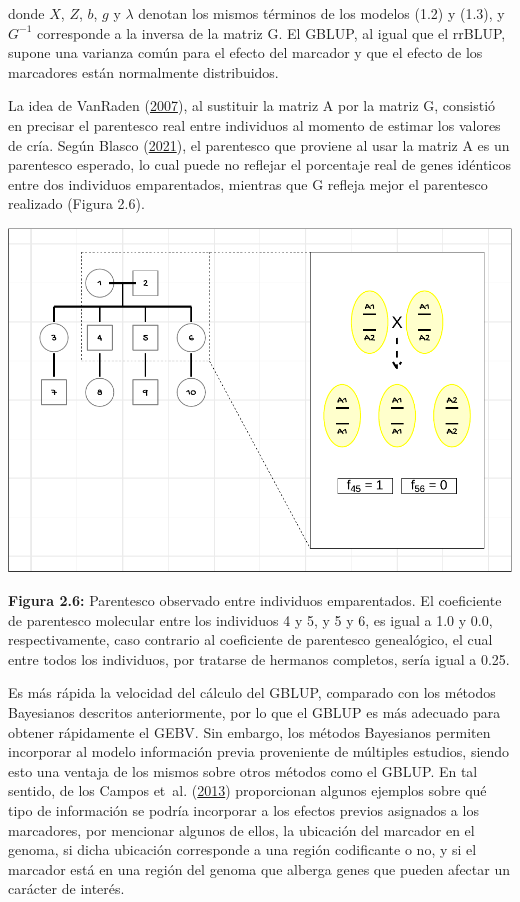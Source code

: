 \documentclass[11pt,spanish,a4paper,oneside,]{book} %
\begin{document}
donde \(X\), \(Z\), \(b\), \(g\) y \(\lambda\) denotan los mismos términos de los modelos (1.2) y (1.3), y \(G^{-1}\) corresponde a la inversa de la matriz G. El GBLUP, al igual que el rrBLUP, supone una varianza común para el efecto del marcador y que el efecto de los marcadores están normalmente distribuidos.

La idea de VanRaden (\protect\hyperlink{ref-cite:39}{2007}), al sustituir la matriz A por la matriz G, consistió en precisar el parentesco real entre individuos al momento de estimar los valores de cría. Según Blasco (\protect\hyperlink{ref-cite:21}{2021}), el parentesco que proviene al usar la matriz A es un parentesco esperado, lo cual puede no reflejar el porcentaje real de genes idénticos entre dos individuos emparentados, mientras que G refleja mejor el parentesco realizado (Figura 2.6).

\begin{center}\includegraphics[width=1\linewidth]{figures/Ped} \end{center}

\noindent
\textbf{Figura 2.6:} Parentesco observado entre individuos emparentados. El coeficiente de parentesco molecular entre los individuos 4 y 5, y 5 y 6, es igual a 1.0 y 0.0, respectivamente, caso contrario al coeficiente de parentesco genealógico, el cual entre todos los individuos, por tratarse de hermanos completos, sería igual a 0.25.

\hspace*{1em}

Es más rápida la velocidad del cálculo del GBLUP, comparado con los métodos Bayesianos descritos anteriormente, por lo que el GBLUP es más adecuado para obtener rápidamente el GEBV. Sin embargo, los métodos Bayesianos permiten incorporar al modelo información previa proveniente de múltiples estudios, siendo esto una ventaja de los mismos sobre otros métodos como el GBLUP. En tal sentido, de los Campos et~al. (\protect\hyperlink{ref-cite:31}{2013}) proporcionan algunos ejemplos sobre qué tipo de información se podría incorporar a los efectos previos asignados a los marcadores, por mencionar algunos de ellos, la ubicación del marcador en el genoma, si dicha ubicación corresponde a una región codificante o no, y si el marcador está en una región del genoma que alberga genes que pueden afectar un carácter de interés.
\end{document}
